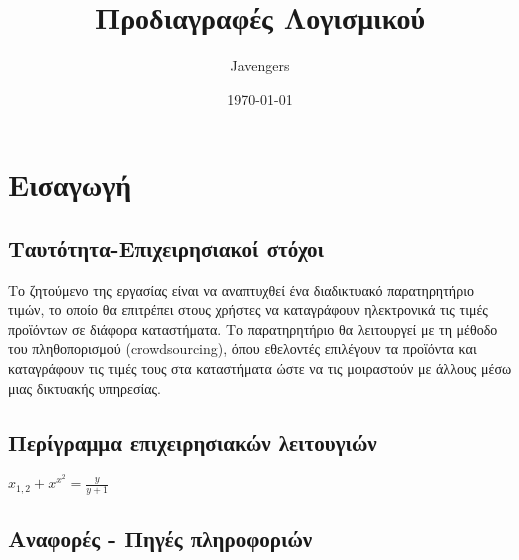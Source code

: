 \documentclass[12pt]{article}
\begin{document}
\title{Προδιαγραφές Λογισμικού}
\date{\today}
\author{Javengers}

\maketitle

\tableofcontents

\section{Εισαγωγή}
\subsection{Ταυτότητα-Επιχειρησιακοί στόχοι}

Το ζητούμενο της εργασίας είναι να αναπτυχθεί ένα διαδικτυακό παρατηρητήριο τιμών, το οποίο θα
επιτρέπει στους χρήστες να καταγράφουν ηλεκτρονικά τις τιμές προϊόντων σε διάφορα καταστήματα. Το
παρατηρητήριο θα λειτουργεί με τη μέθοδο του πληθοπορισμού (crowdsourcing), όπου εθελοντές
επιλέγουν τα προϊόντα και καταγράφουν τις τιμές τους στα καταστήματα ώστε να τις μοιραστούν με
άλλους μέσω μιας δικτυακής υπηρεσίας. 

\subsection{Περίγραμμα επιχειρησιακών λειτουγιών}

$x_{1,2} + x^{x^2} = \frac{y}{y+1}$



\subsection{Αναφορές - Πηγές πληροφοριών}
\end{document}
